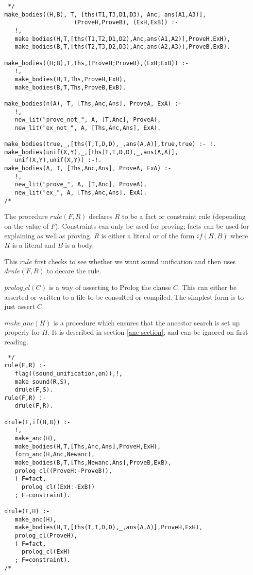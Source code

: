 \begin{verbatim} */
make_bodies((H,B), T, [ths(T1,T3,D1,D3), Anc, ans(A1,A3)],
                    (ProveH,ProveB), (ExH,ExB)) :-
   !,
   make_bodies(H,T,[ths(T1,T2,D1,D2),Anc,ans(A1,A2)],ProveH,ExH),
   make_bodies(B,T,[ths(T2,T3,D2,D3),Anc,ans(A2,A3)],ProveB,ExB).

make_bodies((H;B),T,Ths,(ProveH;ProveB),(ExH;ExB)) :-
   !,
   make_bodies(H,T,Ths,ProveH,ExH),
   make_bodies(B,T,Ths,ProveB,ExB).

make_bodies(n(A), T, [Ths,Anc,Ans], ProveA, ExA) :-
   !,
   new_lit("prove_not_", A, [T,Anc], ProveA),
   new_lit("ex_not_", A, [Ths,Anc,Ans], ExA).

make_bodies(true,_,[ths(T,T,D,D),_,ans(A,A)],true,true) :- !.
make_bodies(unif(X,Y),_,[ths(T,T,D,D),_,ans(A,A)],
   unif(X,Y),unif(X,Y)) :-!.
make_bodies(A, T, [Ths,Anc,Ans], ProveA, ExA) :-
   !,
   new_lit("prove_", A, [T,Anc], ProveA),
   new_lit("ex_", A, [Ths,Anc,Ans], ExA).
/* \end{verbatim}

The procedure $rule(F,R)$ declares $R$ to be a fact
or constraint rule (depending on the value of $F$).
Constraints can only be used for proving;
facts can be used for explaining as well as proving.
$R$ is either a literal or of the form $if(H,B)$ where $H$ is a literal
and $B$ is a body.

This $rule$ first checks to see whether we want sound unification and
then uses $drule(F,R)$ to decare the rule.

$prolog\_cl(C)$ is a way of asserting to Prolog the clause $C$.
This can either be asserted or written to a file to be consulted
or compiled. The simplest form is to just assert $C$.

$make\_anc(H)$ is a procedure which ensures that the ancestor search
is set up properly for $H$. It is described in section \ref{anc-section},
and can be ignored on first reading.

\begin{verbatim} */
rule(F,R) :-
   flag((sound_unification,on)),!,
   make_sound(R,S),
   drule(F,S).
rule(F,R) :-
   drule(F,R).

drule(F,if(H,B)) :-
   !,
   make_anc(H),
   make_bodies(H,T,[Ths,Anc,Ans],ProveH,ExH),
   form_anc(H,Anc,Newanc),
   make_bodies(B,T,[Ths,Newanc,Ans],ProveB,ExB),
   prolog_cl((ProveH:-ProveB)),
   ( F=fact,
     prolog_cl((ExH:-ExB))
   ; F=constraint).

drule(F,H) :-
   make_anc(H),
   make_bodies(H,T,[ths(T,T,D,D),_,ans(A,A)],ProveH,ExH),
   prolog_cl(ProveH),
   ( F=fact,
     prolog_cl(ExH)
   ; F=constraint).
/* \end{verbatim}

